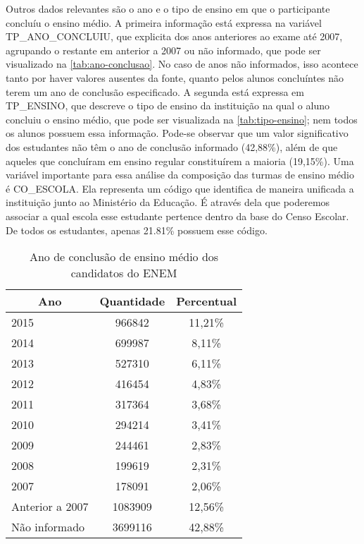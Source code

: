   Outros dados relevantes são o ano e o tipo de ensino em que o participante concluíu o ensino médio. A primeira informação está expressa na variável TP\_ANO\_CONCLUIU, que explicita dos anos anteriores ao exame até 2007, agrupando o restante em anterior a 2007 ou não informado, que pode ser visualizado na \autoref{tab:ano-conclusao}. No caso de anos não informados, isso acontece tanto por haver valores ausentes da fonte, quanto pelos alunos concluíntes não terem um ano de conclusão especificado. A segunda está expressa em TP\_ENSINO, que descreve o tipo de ensino da instituição na qual o aluno concluiu o ensino médio, que pode ser visualizada na \autoref{tab:tipo-ensino}; nem todos os alunos possuem essa informação. Pode-se observar que um valor significativo dos estudantes não têm o ano de conclusão informado (42,88\%), além de que aqueles que concluíram em ensino regular constituírem a maioria (19,15\%). Uma variável importante para essa análise da composição das turmas de ensino médio é CO\_ESCOLA. Ela representa um código que identifica de maneira unificada a instituição junto ao Ministério da Educação. É através dela que poderemos associar a qual escola esse estudante pertence dentro da base do Censo Escolar. De todos os estudantes, apenas 21.81\% possuem esse código.

  \begin{table}[h]
    \begin{tabular}{lcc}
    \hline
    \multicolumn{1}{c}{\textbf{Ano}} & \textbf{Quantidade} & \textbf{Percentual} \\ \hline
    2015                             & 966842              & 11,21\%             \\ \hline
    2014                             & 699987              & 8,11\%              \\ \hline
    2013                             & 527310              & 6,11\%              \\ \hline
    2012                             & 416454              & 4,83\%              \\ \hline
    2011                             & 317364              & 3,68\%              \\ \hline
    2010                             & 294214              & 3,41\%              \\ \hline
    2009                             & 244461              & 2,83\%              \\ \hline
    2008                             & 199619              & 2,31\%              \\ \hline
    2007                             & 178091              & 2,06\%              \\ \hline
    Anterior a 2007                  & 1083909             & 12,56\%             \\ \hline
    Não informado                    & 3699116             & 42,88\%             \\ \hline
    \end{tabular}
    \caption{Ano de conclusão de ensino médio dos candidatos do ENEM}
    \label{tab:ano-conclusao}
    \end{table}

